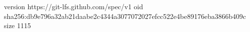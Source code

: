 version https://git-lfs.github.com/spec/v1
oid sha256:db9e796a32ab21daabe2c4344a3077072027efcc522e4be89176eba3866b409c
size 1115
